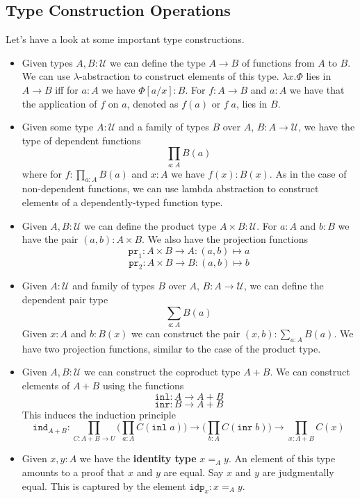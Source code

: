 \documentclass[12pt]{article}
\begin{document}
\subsection{Type Construction Operations}
Let's have a look at some important type constructions.
\begin{itemize}
	\item Given types $A, B : \mathcal{U}$ we can define the type $A \rightarrow B$ of functions from $A$ to $B$. 
		We can use $\lambda$-abstraction to construct elements of this type. $\lambda x. \Phi$ lies in $A \rightarrow B$ iff for $a : A$ we have $\Phi[a/x] : B$. 
		For $f : A \rightarrow B$ and $a : A$ we have that the application of $f$ on $a$, denoted as $f(a)$ or $f\;a$, lies in $B$.
	\item Given some type $A : \mathcal{U}$ and a family of types $B$ over $A$, $B : A \rightarrow \mathcal{U}$, we have the type of dependent functions $$\prod_{a : A} B(a)$$
	where for $f : \prod_{a : A} B(a)$ and $x : A$ we have $f(x) : B(x)$. 
	As in the case of non-dependent functions, we can use lambda abstraction to construct elements of a dependently-typed function type.
	\item Given $A, B : \mathcal{U}$ we can define the product type $A \times B : \mathcal{U}$. 
	For $a : A$ and $b : B$ we have the pair $(a,b) : A \times B$. 
	We also have the projection functions 
	$$\mathtt{pr}_1 : A \times B \rightarrow A : (a,b) \mapsto a$$
	$$\mathtt{pr}_2 : A \times B \rightarrow B : (a,b) \mapsto b$$
	\item Given $A : \mathcal{U}$ and family of types $B$ over $A$, $B : A \rightarrow \mathcal{U}$, we can define the dependent pair type $$\sum_{a : A} B(a)$$
	Given $x : A$ and $b : B(x)$ we can construct the pair $(x,b) : \sum_{a : A} B(a)$. 
	We have two projection functions, similar to the case of the product type.
	\item Given $A, B : \mathcal{U}$ we can construct the coproduct type $A + B$. 
	We can construct elements of $A + B$ using the functions
	$$\mathtt{inl} : A \rightarrow A+B$$
	$$\mathtt{inr} : B \rightarrow A+B$$
	This induces the induction principle
	$$\mathtt{ind}_{A+B} : \prod_{C : A+B \rightarrow U} \Big(\prod_{a : A}C(\mathtt{inl}\;a)\Big) \rightarrow \Big(\prod_{b : A}C(\mathtt{inr}\;b)\Big) \rightarrow \prod_{x : A+ B}C(x)$$
	\item Given $x, y : A$ we have the \textbf{identity type} $x =_A y$. 
	An element of this type amounts to a proof that $x$ and $y$ are equal. 
	Say $x$ and $y$ are judgmentally equal. 
	This is captured by the element $\mathtt{idp}_x : x =_A y$. 

\end{itemize}
\end{document}
